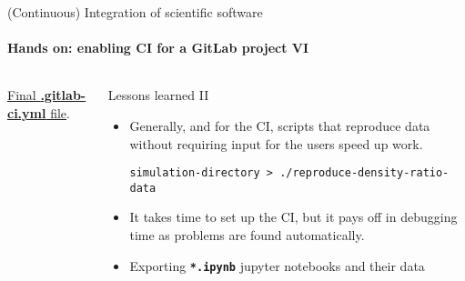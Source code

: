 \begin{frame}[fragile]{(Continuous) Integration of scientific software} 
    \framesubtitle{Hands on: enabling CI for a GitLab project VI} 
    \vfill

    \begin{columns}
        \begin{column}[c]{0.5\textwidth}
    \href{https://gitlab.com/tmaric/minimal-cse-ci-examples/-/blob/01-with-ci/.gitlab-ci.yml}{Final \textbf{.gitlab-ci.yml} file}. 
        \end{column}
        \begin{column}[c]{0.5\textwidth}
            Lessons learned II
            \begin{itemize}
                \item Generally, and for the CI, scripts that reproduce data without requiring input for the users speed up work.
                    \begin{verbatim}
simulation-directory > ./reproduce-density-ratio-data
                    \end{verbatim}
                \item It takes time to set up the CI, but it pays off in debugging time as problems are found automatically. 
                \item Exporting \textbf{\texttt{*.ipynb}} jupyter notebooks and their data  
            \end{itemize}
        \end{column}
    \end{columns}

\end{frame}
